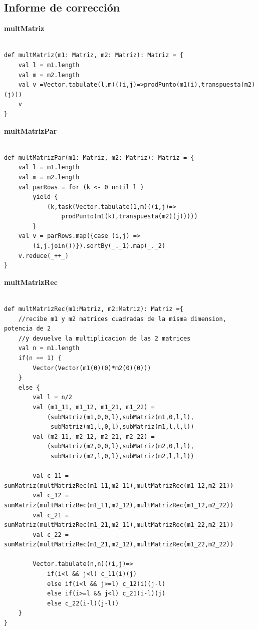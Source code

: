 \documentclass[12pt, a4paper]{article}
\begin{document}
\subsection{Informe de corrección}
\textbf{{multMatriz}} \\ \\
\begin{lstlisting}[caption=mult matriz, label=lst:scala_code6]
def multMatriz(m1: Matriz, m2: Matriz): Matriz = {
    val l = m1.length
    val m = m2.length
    val v =Vector.tabulate(l,m)((i,j)=>prodPunto(m1(i),transpuesta(m2)(j)))
    v
}
\end{lstlisting}
\textbf{{multMatrizPar}} \\ \\
\begin{lstlisting}[caption=mult matriz paralela, label=lst:scala_code7]
def multMatrizPar(m1: Matriz, m2: Matriz): Matriz = {
    val l = m1.length
    val m = m2.length
    val parRows = for (k <- 0 until l ) 
        yield {
            (k,task(Vector.tabulate(1,m)((i,j)=>
                prodPunto(m1(k),transpuesta(m2)(j)))))
        }
    val v = parRows.map({case (i,j) => 
        (i,j.join())}).sortBy(_._1).map(_._2)
    v.reduce(_++_)
}
\end{lstlisting}
\textbf{{multMatrizRec}} \\ \\
\begin{lstlisting}[caption=mult matriz recursiva, label=lst:scala_code8]
def multMatrizRec(m1:Matriz, m2:Matriz): Matriz ={
    //recibe m1 y m2 matrices cuadradas de la misma dimension, potencia de 2
    //y devuelve la multiplicacion de las 2 matrices
    val n = m1.length
    if(n == 1) {
        Vector(Vector(m1(0)(0)*m2(0)(0)))
    }
    else {
        val l = n/2
        val (m1_11, m1_12, m1_21, m1_22) = 
            (subMatriz(m1,0,0,l),subMatriz(m1,0,l,l),
             subMatriz(m1,l,0,l),subMatriz(m1,l,l,l))
        val (m2_11, m2_12, m2_21, m2_22) =
            (subMatriz(m2,0,0,l),subMatriz(m2,0,l,l),
             subMatriz(m2,l,0,l),subMatriz(m2,l,l,l))

        val c_11 = sumMatriz(multMatrizRec(m1_11,m2_11),multMatrizRec(m1_12,m2_21))
        val c_12 = sumMatriz(multMatrizRec(m1_11,m2_12),multMatrizRec(m1_12,m2_22))
        val c_21 = sumMatriz(multMatrizRec(m1_21,m2_11),multMatrizRec(m1_22,m2_21))
        val c_22 = sumMatriz(multMatrizRec(m1_21,m2_12),multMatrizRec(m1_22,m2_22))

        Vector.tabulate(n,n)((i,j)=>
            if(i<l && j<l) c_11(i)(j)
            else if(i<l && j>=l) c_12(i)(j-l)
            else if(i>=l && j<l) c_21(i-l)(j)
            else c_22(i-l)(j-l))
    }
}
\end{lstlisting}
\end{document}
